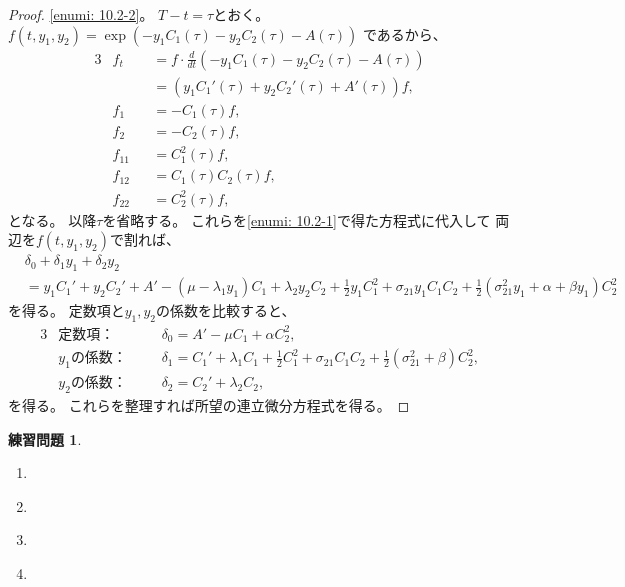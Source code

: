 \documentclass[uplatex]{jsarticle}
\theoremstyle{definition}
\newtheorem{prob}[prob]{練習問題}
\begin{document}
\begin{proof}
  \ref{enumi: 10.2-2}。
  \(T-t = \tau\)とおく。
  \(f(t,y_1,y_2)
  = \exp\left( - y_1C_1(\tau) - y_2C_2(\tau) - A(\tau) \right)\)
  であるから、
  \begin{alignat*}{3}
    &f_t &
    &= f\cdot \frac{d}{dt}\left( - y_1C_1(\tau) - y_2C_2(\tau) - A(\tau)\right) \\
    & &
    &= \left( y_1C_1'(\tau) + y_2C_2'(\tau) + A'(\tau)\right) f, \\
    &f_1 & &= -C_1(\tau)f, \\
    &f_2 & &= -C_2(\tau)f, \\
    &f_{11} & &= C_1^2(\tau)f, \\
    &f_{12} & &= C_1(\tau)C_2(\tau)f, \\
    &f_{22} & &= C_2^2(\tau)f,
  \end{alignat*}
  となる。
  以降\(\tau\)を省略する。
  これらを\ref{enumi: 10.2-1}で得た方程式に代入して
  両辺を\(f(t,y_1,y_2)\)で割れば、
  \begin{align*}
    &\delta_0 + \delta_1y_1 + \delta_2y_2 \\
    &= y_1C_1' + y_2C_2' + A' - (\mu-\lambda_1 y_1)C_1 + \lambda_2y_2C_2
    + \frac{1}{2}y_1C_1^2
    + \sigma_{21}y_1C_1C_2
    + \frac{1}{2}(\sigma_{21}^2y_1 + \alpha + \beta y_1)C_2^2
  \end{align*}
  を得る。
  定数項と\(y_1,y_2\)の係数を比較すると、
  \begin{alignat*}{3}
    &\text{定数項：} & \ \ \ \
    &\delta_0 = A' - \mu C_1 + \alpha C_2^2,  \\
    &\text{\(y_1\)の係数：} & \ \ \ \
    &\delta_1 = C_1' + \lambda_1C_1 + \frac{1}{2}C_1^2
    + \sigma_{21}C_1C_2 + \frac{1}{2}(\sigma_{21}^2+\beta)C_2^2, \\
    &\text{\(y_2\)の係数：} & \ \ \ \
    &\delta_2 = C_2' + \lambda_2C_2,
  \end{alignat*}
  を得る。
  これらを整理すれば所望の連立微分方程式を得る。
\end{proof}












\begin{prob}\label{prob: 10.3}
  \begin{enumerate}
    \item \label{enumi: 10.3-1}
    \item \label{enumi: 10.3-2}
    \item \label{enumi: 10.3-3}
    \item \label{enumi: 10.3-4}
  \end{enumerate}
\end{prob}
\end{document}
